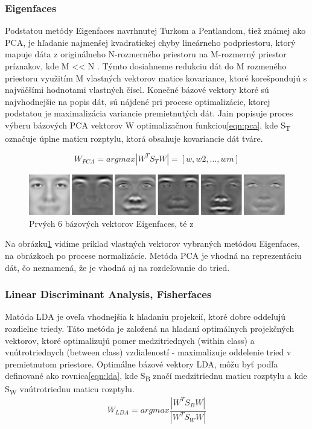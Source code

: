 \subsubsection{Eigenfaces}
Podstatou metódy Eigenfaces navrhnutej Turkom a Pentlandom\cite{turk1991eigenfaces}, tiež známej ako PCA,
je hľadanie najmenšej kvadratickej chyby lineárneho podpriestoru,
ktorý mapuje dáta z originálneho N-rozmerného priestoru na M-rozmerný priestor príznakov, kde M << N .
Týmto dosiahneme redukciu dát do M rozmeného priestoru využitím M vlastných vektorov matice kovariance, ktoré korešpondujú s najväčšími hodnotami vlastných čísel\cite{handbookbio}.
Konečné bázové vektory ktoré sú najvhodnejšie na popis dát, sú nájdené pri procese optimalizácie, ktorej podstatou je  maximalizácia variancie premietnutých dát.
Jain popisuje\cite{handbookbio} proces výberu bázových PCA vektorov W optimalizačnou funkciou\eqref{eqn:pca}, kde S\textsubscript{T} označuje úplne maticu rozptylu,
ktorá obsahuje kovariancie dát tváre.


\begin{equation}\label{eqn:pca}
	W_{PCA} = arg max|W^T S_T W| = [w, w2,\dots,wm]
\end{equation}

\begin{figure}[H]
	\centering
	\includegraphics[width=1\linewidth]{img/eigenfaces}
	\caption{Prvých 6 bázových vektorov Eigenfaces, té z\cite[s.~45]{handbookbio}}
	\label{fig:eigenfaces}
\end{figure}

Na obrázku\ref{fig:eigenfaces} vidíme príklad vlastných vektorov vybraných metódou Eigenfaces, na obrázkoch po procese normalizácie.
Metóda PCA je vhodná na reprezentáciu dát, čo neznamená, že je vhodná aj na rozdeľovanie do tried.

\subsubsection{Linear Discriminant Analysis, Fisherfaces}
Matóda LDA\cite{duda2012pattern} je oveľa vhodnejšia k hľadaniu projekcií, ktoré dobre oddeľujú rozdielne triedy.
Táto metóda je založená na hľadaní optimálnych projekčných vektorov, ktoré optimalizujú pomer medzitriednych (within class) a vnútrotriednych (between class) vzdialeností - maximalizuje oddelenie tried
v premietnutom priestore.
Optimálne bázové vektory LDA, môžu byť podľa\cite{handbookbio} definované ako rovnica\eqref{eqn:lda}, kde S\textsubscript{B} značí medzitriednu maticu rozptylu a kde S\textsubscript{W}
vnútrotriednu maticu rozptylu.\\
\indent
\begin{equation}\label{eqn:lda}
	W_{LDA} = arg max \frac{|W^T S_B W|}{|W^T S_W W|}
\end{equation}

